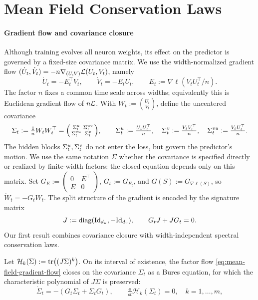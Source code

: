 \section{Mean Field Conservation Laws}
\vspace{-0.5em}
\label{sec:laws}\label{sec:conservation-hyperbolic}

\paragraph{Gradient flow and covariance closure}
Although training evolves all neuron weights, its effect on the
predictor is governed by a fixed-size covariance matrix.
We use the width-normalized gradient flow
$(\dot U_t,\dot V_t)=-n\nabla_{(U,V)}\mathcal L(U_t,V_t)$, namely
\begin{equation}\label{eq:mean-field-gradient-flow}
 \dot U_t=-E_t^\top V_t,\qquad
 \dot V_t=-E_tU_t,\qquad E_t:=\nabla\ell(V_tU_t^\top/n).
\end{equation}
The factor $n$ fixes a common time scale across widths; equivalently
this is Euclidean gradient flow of $n\mathcal L$.
With $W_t:=\binom{U_t}{V_t}$, define the uncentered covariance
\[
 \Sigma_t:=\tfrac1nW_tW_t^\top
 =\begin{psmallmatrix}\Sigma^u_t&\Sigma^{uv}_t\\\Sigma^{vu}_t&\Sigma^v_t\end{psmallmatrix},
 \qquad
 \Sigma^u_t:=\tfrac{U_tU_t^\top}{n},\quad
 \Sigma^v_t:=\tfrac{V_tV_t^\top}{n},\quad
 \Sigma^{vu}_t:=\tfrac{V_tU_t^\top}{n}.
\]
The hidden blocks $\Sigma^u_t,\Sigma^v_t$ do not enter the loss, but govern
the predictor's motion. We use the same notation $\Sigma$ whether the
covariance is specified directly or realized by finite-width factors:
the closed equation depends only on this matrix.
Set
$G_E:=\left(\begin{smallmatrix}0&E^\top\\E&0\end{smallmatrix}\right)$,
$G_t:=G_{E_t}$, and $G(S):=G_{\nabla\ell(S)}$, so $\dot W_t=-G_tW_t$.
The split structure of the gradient is encoded by the signature matrix
\[
 J:=\operatorname{diag}(\mathrm{Id}_{d_u},-\mathrm{Id}_{d_v}),\qquad G_tJ+JG_t=0.
\]
Our first result combines covariance closure with width-independent spectral conservation laws.
\begin{proposition}
\label{prop:covariance-closure-laws}
Let $\mathcal H_k(\Sigma):=\operatorname{tr}\!\left((J\Sigma)^k\right)$.
On its interval of existence, the factor flow
\eqref{eq:mean-field-gradient-flow} closes on the covariance $\Sigma_t$ as a Bures equation, for which the characteristic polynomial of $J\Sigma$ is preserved:
\begin{equation}\label{eq:bures-G}
 \dot\Sigma_t=-(G_t\Sigma_t+\Sigma_tG_t), \qquad
 \tfrac{\dd}{\dd t}\mathcal H_k(\Sigma_t)=0, \quad k=1,\ldots,m,
\end{equation}
\end{proposition}

